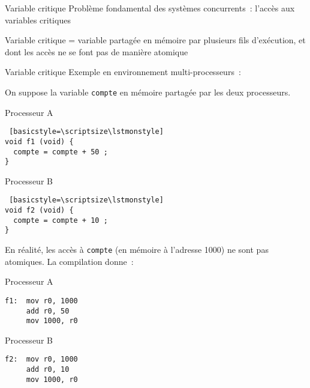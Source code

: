%
%

\def\inc{inc3-excl}




\begin {frame} {Variable critique}
    Problème fondamental des systèmes concurrents~: l'accès aux
    variables critiques

    \vspace* {5mm}

    Variable critique = variable partagée en mémoire par plusieurs fils
    d'exécution, et dont les accès ne se font pas de manière atomique

\end {frame}

\begin {frame} [fragile] {Variable critique}
    Exemple en environnement multi-processeurs~:

    \vspace* {3mm}

    On suppose la variable \texttt {compte} en mémoire partagée
    par les deux processeurs.

    \vspace* {2mm}

\begin {minipage} {.45\textwidth}
\centerline {Processeur A}
\begin {lstlisting} [basicstyle=\scriptsize\lstmonstyle]
void f1 (void) {
  compte = compte + 50 ;
}
\end{lstlisting}
\end {minipage}
\hfill
\begin {minipage} {.45\textwidth}
\centerline {Processeur B}
\begin {lstlisting} [basicstyle=\scriptsize\lstmonstyle]
void f2 (void) {
  compte = compte + 10 ;
}
\end{lstlisting}
\end {minipage}

    \vspace* {2mm}

    En réalité, les accès à \texttt {compte} (en mémoire à l'adresse
    1000) ne sont pas atomiques. La compilation donne~:

    \vspace* {2mm}

\begin {minipage} {.45\textwidth}
\centerline {Processeur A}
\begin {lstlisting}
f1:  mov r0, 1000
     add r0, 50
     mov 1000, r0
\end{lstlisting}
\end {minipage}
\hfill
\begin {minipage} {.45\textwidth}
\centerline {Processeur B}
\begin {lstlisting}
f2:  mov r0, 1000
     add r0, 10
     mov 1000, r0
\end{lstlisting}
\end {minipage}

\end{frame}


